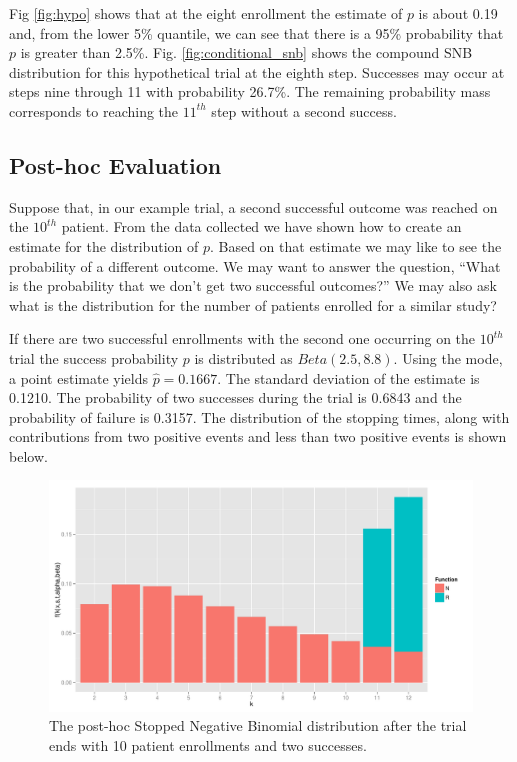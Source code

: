 \documentclass[12pt]{article}         %
\begin{document}
Fig \ref{fig:hypo} shows that at the eight enrollment the estimate of $p$ is 
about 0.19 and, from the lower 5\% quantile, we can see that there is
a 95\% probability that $p$ is greater than 2.5\%. 
Fig. \ref{fig:conditional_snb} shows the compound SNB distribution for this 
hypothetical trial at the eighth step.  Successes may occur 
at steps nine through 11 with probability 26.7\%. The remaining probability
mass corresponds to reaching the $11^{th}$ step without a second success.

\subsection{Post-hoc Evaluation}

Suppose that, in our example trial, a second successful outcome was reached 
on the $10^{th}$ patient. From the data collected we have shown how to create 
an estimate for the distribution of $p$. Based on that estimate we may like to 
see the probability of a different outcome. We may want to answer the
question, ``What is the probability that we don't get two successful outcomes?''
We may also ask what is the distribution for the number of patients 
enrolled for a similar study?

If there are two successful enrollments with the second one occurring 
on the $10^{th}$ trial the success probability $p$ is distributed as 
$Beta(2.5, 8.8)$. 
Using the mode, a point estimate yields $\hat{p} = 0.1667$. The standard 
deviation of the estimate is 0.1210. The probability of two successes during 
the trial is 0.6843 and the probability of failure is 0.3157. The distribution 
of the stopping times, along with contributions from two positive events and 
less than two positive events is shown below.

\begin{figure}[ht]
\includegraphics[width=\textwidth]{post_hoc.pdf}
\caption{
The post-hoc Stopped Negative Binomial distribution after the trial ends with 10 patient enrollments and two successes.
}
\label{fig:post_hoc}
\end{figure}
\end{document}
